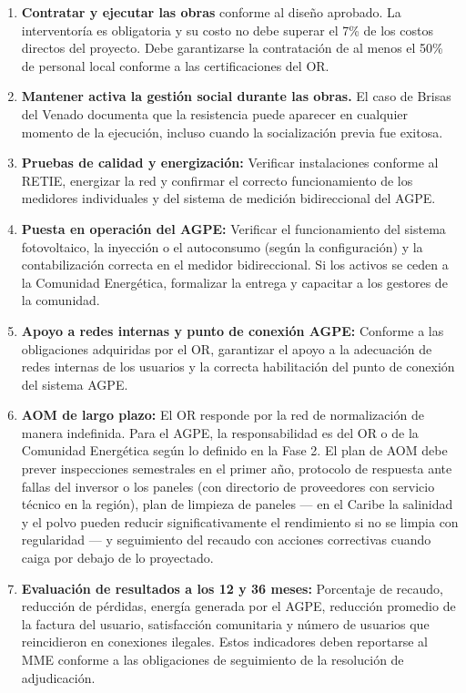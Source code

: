 \begin{enumerate}[label=\textbf{\arabic*.}, leftmargin=1.8cm, itemsep=6pt]

    \item \textbf{Contratar y ejecutar las obras} conforme al diseño
    aprobado. La interventoría es obligatoria y su costo no debe superar
    el 7\% de los costos directos del proyecto. Debe garantizarse la
    contratación de al menos el 50\% de personal local conforme a las
    certificaciones del OR.

    \item \textbf{Mantener activa la gestión social durante las obras.}
    El caso de Brisas del Venado documenta que la resistencia puede
    aparecer en cualquier momento de la ejecución, incluso cuando la
    socialización previa fue exitosa.

    \item \textbf{Pruebas de calidad y energización:} Verificar
    instalaciones conforme al RETIE, energizar la red y confirmar el
    correcto funcionamiento de los medidores individuales y del sistema
    de medición bidireccional del AGPE.

    \item \textbf{Puesta en operación del AGPE:} Verificar el
    funcionamiento del sistema fotovoltaico, la inyección o el
    autoconsumo (según la configuración) y la contabilización correcta
    en el medidor bidireccional. Si los activos se ceden a la Comunidad
    Energética, formalizar la entrega y capacitar a los gestores de la
    comunidad.

    \item \textbf{Apoyo a redes internas y punto de conexión AGPE:}
    Conforme a las obligaciones adquiridas por el OR, garantizar el
    apoyo a la adecuación de redes internas de los usuarios y la
    correcta habilitación del punto de conexión del sistema AGPE.

    \item \textbf{AOM de largo plazo:} El OR responde por la red de
    normalización de manera indefinida. Para el AGPE, la responsabilidad
    es del OR o de la Comunidad Energética según lo definido en la
    Fase 2. El plan de AOM debe prever inspecciones semestrales en el
    primer año, protocolo de respuesta ante fallas del inversor o los
    paneles (con directorio de proveedores con servicio técnico en la
    región), plan de limpieza de paneles — en el Caribe la salinidad
    y el polvo pueden reducir significativamente el rendimiento si no
    se limpia con regularidad — y seguimiento del recaudo con acciones
    correctivas cuando caiga por debajo de lo proyectado.

    \item \textbf{Evaluación de resultados a los 12 y 36 meses:}
    Porcentaje de recaudo, reducción de pérdidas, energía generada por
    el AGPE, reducción promedio de la factura del usuario, satisfacción
    comunitaria y número de usuarios que reincidieron en conexiones
    ilegales. Estos indicadores deben reportarse al MME conforme a las
    obligaciones de seguimiento de la resolución de adjudicación.
\end{enumerate}

